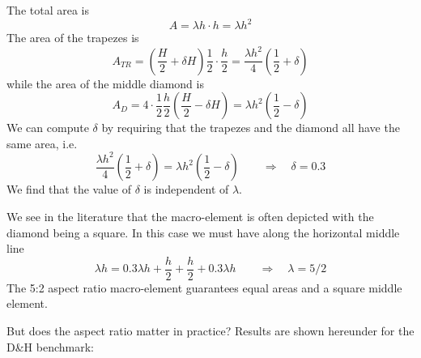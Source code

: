\begin{center}
\end{center}

The total area is 
\[
A= \lambda h \cdot h = \lambda h^2
\]
The area of the trapezes is
\[
A_{TR} = (\frac{H}{2} + \delta H)\frac12 \cdot \frac{h}{2}=\frac{\lambda h^2}{4} \left(\frac12 + \delta \right)
\]
while the area of the middle diamond is
\[
A_D = 4 \cdot \frac12 \frac{h}{2} \left(\frac{H}{2}-\delta H \right) 
= \lambda h^2 \left(\frac12 - \delta \right)
\]
We can compute $\delta$ by requiring that the trapezes and the diamond all 
have the same area, i.e.
\[
\frac{\lambda h^2}{4} (\frac12 + \delta)
=
\lambda h^2 (\frac12 - \delta)
\qquad
\Rightarrow \quad \delta = 0.3
\]
We find that the value of $\delta$ is independent of $\lambda$.

We see in the literature \cite{sten84,brfo,chba93}  that the 
macro-element is often depicted with the diamond being a square.
In this case we must have along the horizontal middle line
\[
\lambda h = 0.3 \lambda h + \frac{h}{2}+ \frac{h}{2} + 0.3 \lambda h
\qquad
\Rightarrow \quad 
\lambda=5/2
\]
The 5:2 aspect ratio macro-element guarantees equal areas and a square middle element.

But does the aspect ratio matter in practice? 
Results are shown hereunder for the D\&H benchmark:

